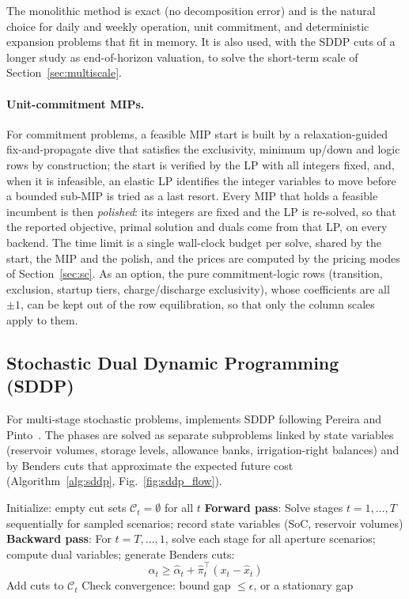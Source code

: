 The monolithic method is exact (no decomposition error) and is the
natural choice for daily and weekly operation, unit commitment, and
deterministic expansion problems that fit in memory.  It is also used,
with the SDDP cuts of a longer study as end-of-horizon valuation, to
solve the short-term scale of Section~\ref{sec:multiscale}.

\paragraph{Unit-commitment MIPs.}
For commitment problems, a feasible MIP start is built by a
relaxation-guided fix-and-propagate dive that satisfies the
exclusivity, minimum up/down and logic rows by construction; the start
is verified by the LP with all integers fixed, and, when it is
infeasible, an elastic LP identifies the integer variables to move
before a bounded sub-MIP is tried as a last resort.  Every MIP that
holds a feasible incumbent is then \emph{polished}: its integers are
fixed and the LP is re-solved, so that the reported objective, primal
solution and duals come from that LP, on every backend.  The time limit
is a single wall-clock budget per solve, shared by the start, the MIP
and the polish, and the prices are computed by the pricing modes of
Section~\ref{sec:sc}.  As an option, the pure commitment-logic rows
(transition, exclusion, startup tiers, charge/discharge exclusivity),
whose coefficients are all $\pm 1$, can be kept out of the row
equilibration, so that only the column scales apply to them.

\subsection{Stochastic Dual Dynamic Programming (SDDP)}
\label{sec:sddp}

For multi-stage stochastic problems, \gtopt{} implements SDDP following
Pereira and Pinto~\cite{pereira1991sddp}.  The phases are solved as
separate subproblems linked by state variables (reservoir volumes,
storage levels, allowance banks, irrigation-right balances) and by
Benders cuts that approximate the expected future cost
(Algorithm~\ref{alg:sddp}, Fig.~\ref{fig:sddp_flow}).

\begin{algorithm}[ht]
  \caption{SDDP Algorithm in \gtopt{}}
  \label{alg:sddp}
  \begin{algorithmic}[1]
    \STATE Initialize: empty cut sets $\mathcal{C}_t = \emptyset$
      for all $t$
      \STATE \textbf{Forward pass}: Solve stages $t=1,\ldots,T$
        sequentially for sampled scenarios; record state variables
        (SoC, reservoir volumes)
      \STATE \textbf{Backward pass}: For $t=T,\ldots,1$, solve
        each stage for all aperture scenarios; compute dual
        variables; generate Benders cuts:
        \[
          \alpha_t \geq \hat{\alpha}_t + \hat{\pi}_t^\top
            (x_t - \hat{x}_t)
        \]
      \STATE Add cuts to $\mathcal{C}_t$
      \STATE Check convergence: bound gap $\leq \epsilon$, or a stationary gap
    \ENDFOR
  \end{algorithmic}
\end{algorithm}

